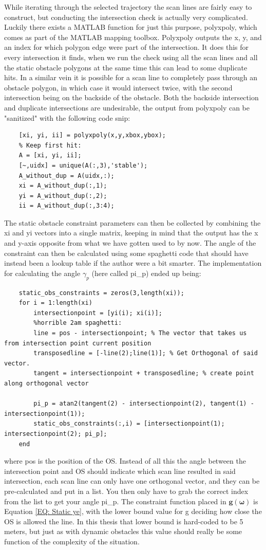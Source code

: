 While iterating through the selected trajectory the scan lines are fairly easy to construct, but conducting the intersection check is actually very complicated. Luckily
there exists a MATLAB function for just this purpose, polyxpoly, which comes as part of the MATLAB mapping toolbox. Polyxpoly outputs the x, y, 
and an index for which polygon edge were part of the intersection. It does this for every intersection it finds, when we run the check using all the scan lines
and all the static obstacle polygons at the same time this can lead to some duplicate hits. In a similar vein it is possible for a scan line to completely pass through
an obstacle polygon, in which case it would intersect twice, with the second intersection being on the backside of the obstacle. Both the backside intersection and
duplicate intersections are undesirable, the output from polyxpoly can be "sanitized" with the following code snip:
\begin{lstlisting}
    [xi, yi, ii] = polyxpoly(x,y,xbox,ybox);
    % Keep first hit:
    A = [xi, yi, ii];
    [~,uidx] = unique(A(:,3),'stable');
    A_without_dup = A(uidx,:);
    xi = A_without_dup(:,1);
    yi = A_without_dup(:,2);
    ii = A_without_dup(:,3:4);
\end{lstlisting}
The static obstacle constraint parameters can then be collected by combining the xi and yi vectors into a single matrix, keeping in mind that the output
has the x and y-axis opposite from what we have gotten used to by now. The angle of the constraint can then be calculated using some spaghetti code that should
have instead been a lookup table if the author were a bit smarter. The implementation for calculating the angle $\gamma_p$ (here called pi\_p) ended up being:
\begin{lstlisting}
    static_obs_constraints = zeros(3,length(xi));
    for i = 1:length(xi)
        intersectionpoint = [yi(i); xi(i)];
        %horrible 2am spaghetti:
        line = pos - intersectionpoint; % The vector that takes us from intersection point current position
        transposedline = [-line(2);line(1)]; % Get Orthogonal of said vector.
        tangent = intersectionpoint + transposedline; % create point along orthogonal vector
        
        pi_p = atan2(tangent(2) - intersectionpoint(2), tangent(1) - intersectionpoint(1));
        static_obs_constraints(:,i) = [intersectionpoint(1); intersectionpoint(2); pi_p];
    end 
\end{lstlisting}
where pos is the position of the OS. Instead of all this the angle between the intersection point and OS should indicate which scan line resulted
in said intersection, each scan line can only have one orthogonal vector, and they can be pre-calculated and put in a list. You then only have to grab the correct index
from the list to get your angle pi\_p. The constraint function placed in $\textbf{g}(\bm{\omega})$ is Equation \eqref{EQ: Static ye}, with the lower
bound value for g deciding how close the \gls{OS} is allowed the line. In this thesis that lower bound is hard-coded to be 5 meters, but just as with dynamic obstacles
this value should really be some function of the complexity of the situation.



